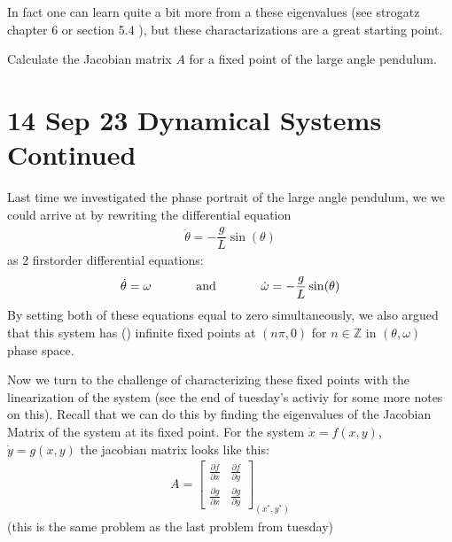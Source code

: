 \documentclass[letterpaper,10pt,english]{jupyterBook}
\begin{document}
\sphinxAtStartPar
In fact one can learn quite a bit more from a these eigenvalues (see strogatz chapter 6 or section 5.4 ), but these charactarizations are a great starting point.

\sphinxAtStartPar
{}

\sphinxAtStartPar
Calculate the Jacobian matrix \(A\) for a fixed point of the large angle pendulum.



\sphinxstepscope


\chapter{14 Sep 23 \sphinxhyphen{} Dynamical Systems Continued}
\label{\detokenize{content/1_mechanics/dynamical_2:sep-23-dynamical-systems-continued}}\label{\detokenize{content/1_mechanics/dynamical_2::doc}}
\sphinxAtStartPar
Last time we investigated the phase portrait of the large angle pendulum, we we could arrive at by re\sphinxhyphen{}writing the differential equation
\begin{equation*}
\begin{split}
\ddot{\theta} = -\dfrac{g}{L}\sin(\theta)
\end{split}
\end{equation*}
\sphinxAtStartPar
as 2 first\sphinxhyphen{}order differential equations:
\begin{equation*}
\begin{split}
\dot{\theta} = \omega \hspace{0.5in}\text{and}\hspace{0.5in} \dot{\omega} = -\frac{g}{L}\sin(\theta)
\end{split}
\end{equation*}
\sphinxAtStartPar
By setting both of these equations equal to zero simultaneously, we also argued that this system has () infinite fixed points at \((n\pi, 0)\) for  \(n\in \mathbb{Z}\) in \((\theta,\omega)\) phase space.

\sphinxAtStartPar
Now we turn to the challenge of characterizing these fixed points with the linearization of the system (see the end of tuesday’s activiy for some more notes on this). Recall that we can do this by finding the eigenvalues of the Jacobian Matrix of the system at its fixed point. For the system \(\dot{x} = f(x,y)\), \(\dot{y} = g(x,y)\) the jacobian matrix looks like this:
\begin{equation*}
\begin{split}
A = \begin{bmatrix} \frac{\partial f}{\partial x} & \frac{\partial f}{\partial y} \\ \frac{\partial g}{\partial x} & \frac{\partial g}{\partial y}\end{bmatrix}_{(x^*,y^*)}
\end{split}
\end{equation*}
\sphinxAtStartPar
{}
(this is the same problem as the last problem from tuesday)
\end{document}
